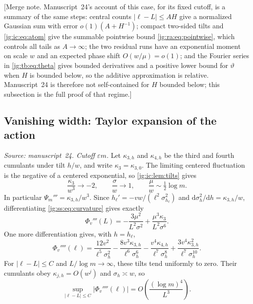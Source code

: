 \documentclass[11pt,a4paper]{article}
\theoremstyle{definition}\newaliascnt{definition}{theorem}
\theoremstyle{remark}\newaliascnt{remark}{theorem}
\newcommand{\dd}{\mathrm d}
\begin{document}
[Merge note. Manuscript~24's account of this case, for its fixed cutoff, is a
summary of the same steps: central counts $|\ell-L|\le AH$ give a normalized
Gaussian sum with error $o(1)(A+H^{-1})$; compact two-sided tilts and
\eqref{jg:ic:eq:atom} give the summable pointwise bound
\eqref{jg:ra:eq:pointwise}, which controls all tails as $A\to\infty$; the two
residual runs have an exponential moment on scale $w$ and an expected phase
shift $O(w/\mu)=o(1)$; and the Fourier series in \eqref{jg:tb:eq:theta} gives
bounded derivatives and a positive lower bound for $\vartheta$ when $H$ is
bounded below, so the additive approximation is relative. Manuscript~24 is
therefore not self-contained for $H$ bounded below; this subsection is the full
proof of that regime.]

\subsection{Vanishing width: Taylor expansion of the action}
\label{jg:sec:taylor}
\emph{Source: manuscript~24. Cutoff $\varepsilon m$.} Let $\kappa_{3,h}$ and
$\kappa_{4,h}$ be the third and fourth cumulants under tilt $h/w$, and write
$\kappa_3=\kappa_{3,0}$. The limiting centered fluctuation is the negative of a
centered exponential, so \cref{jg:ic:lem:tilts} gives
\begin{equation}\label{jg:ss:eq:cumulants}
 \frac{\kappa_3}{w^3}\to-2,\qquad \frac{\sigma}{w}\to1,\qquad
 \frac{\mu}{w}\sim\tfrac12\log m.
\end{equation}
In particular $\Psi_m'''=\kappa_{3,h}/w^3$. Since
$h_\ell'=-vw/(\ell^2\sigma_{h_\ell}^2)$ and $\dd\sigma_h^2/\dd h=\kappa_{3,h}/w$,
differentiating \eqref{jg:ss:eq:curvature} gives exactly
\begin{equation}\label{jg:ss:eq:third}
 \Phi_v'''(L)=-\frac{3\mu^2}{L^2\sigma^2}
              +\frac{\mu^3\kappa_3}{L^2\sigma^6}.
\end{equation}
One more differentiation gives, with $h=h_\ell$,
\begin{equation}\label{jg:ss:eq:fourth}
 \Phi_v''''(\ell)=
 \frac{12v^2}{\ell^5\sigma_h^2}
 -\frac{8v^3\kappa_{3,h}}{\ell^6\sigma_h^6}
 -\frac{v^4\kappa_{4,h}}{\ell^7\sigma_h^8}
 +\frac{3v^4\kappa_{3,h}^2}{\ell^7\sigma_h^{10}}.
\end{equation}
For $|\ell-L|\le C$ and $L/\log m\to\infty$, these tilts tend uniformly to zero.
Their cumulants obey $\kappa_{j,h}=O(w^j)$ and $\sigma_h\asymp w$, so
\begin{equation}\label{jg:ss:eq:fourthbound}
 \sup_{|\ell-L|\le C}|\Phi_v''''(\ell)|
       =O\!\left(\frac{(\log m)^4}{L^3}\right).
\end{equation}
\end{document}
